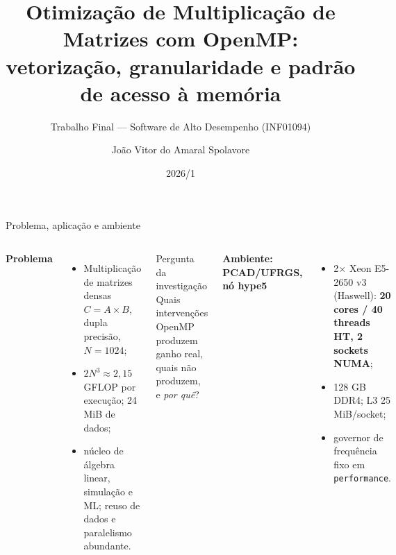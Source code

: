 \documentclass[10pt,aspectratio=169]{beamer}
\title[Otimização de Matmul com OpenMP]{Otimização de Multiplicação de Matrizes com OpenMP:\\vetorização, granularidade e padrão de acesso à memória}
\subtitle{Trabalho Final --- Software de Alto Desempenho (INF01094)}
\author{João Vitor do Amaral Spolavore}
\institute{Instituto de Informática --- UFRGS}
\date{2026/1}
\begin{document}
\begin{frame}
  \titlepage
\end{frame}

\begin{frame}{Problema, aplicação e ambiente}
  \begin{columns}[T]
      \textbf{Problema}
      \begin{itemize}
        \item Multiplicação de matrizes densas $C = A \times B$, dupla precisão, $N = 1024$;
        \item $2N^3 \approx 2{,}15$ GFLOP por execução; 24 MiB de dados;
        \item núcleo de álgebra linear, simulação e ML; reuso de dados e paralelismo abundante.
      \end{itemize}
      \begin{block}{Pergunta da investigação}
        Quais intervenções OpenMP produzem ganho real, quais não produzem, e \emph{por quê}?
      \end{block}
      \textbf{Ambiente: PCAD/UFRGS, nó hype5}
      \begin{itemize}
        \item 2$\times$ Xeon E5-2650 v3 (Haswell): \textbf{20 cores / 40 threads HT, 2 sockets NUMA};
        \item 128 GB DDR4; L3 25 MiB/socket;
        \item governor de frequência fixo em \texttt{performance}.
      \end{itemize}
  \end{columns}
\end{frame}
\end{document}
